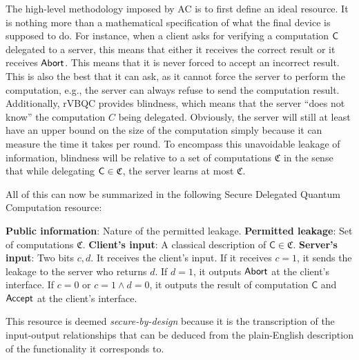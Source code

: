 The high-level methodology imposed by AC is to first define an ideal resource. It is nothing more than a mathematical specification of what the final device is supposed to do. For instance, when a client asks for verifying a computation \(\mathsf{C}\) delegated to a server, this means that either it receives the correct result or it receives \(\mathsf{Abort}\). This means that it is never forced to accept an incorrect result. This is also the best that it can ask, as it cannot force the server to perform the computation, e.g., the server can always refuse to send the computation result. Additionally, rVBQC provides blindness, which means that the server ``does not know'' the computation \(C\) being delegated. Obviously, the server will still at least have an upper bound on the size of the computation simply because it can measure the time it takes per round. To encompass this unavoidable leakage of information, blindness will be relative to a set of computations \(\mathfrak{C}\) in the sense that while delegating \(\mathsf{C}\in \mathfrak{C}\), the server learns at most \(\mathfrak{C}\).

All of this can now be summarized in the following Secure Delegated Quantum Computation resource:
\begin{resource}
  \label{res:sdqc}
  \item
  \begin{algorithmic}[0]
    \State \textbf{Public information}: Nature of the permitted leakage.
    \State \textbf{Permitted leakage}: Set of computations \(\mathfrak{C}\).
    \State \textbf{Client's input}: A classical description of \(\mathsf{C} \in \mathfrak{C}\).
    \State \textbf{Server's input}: Two bits \(c,d\).
    \State It receives the client's input.
    \State If it receives \(c=1\), it sends the leakage to the server who returns \(d\).
    \State If \(d=1\), it outputs \(\mathsf{Abort}\) at the client's interface.
    \State If \(c=0\) or \(c=1 \wedge d=0\), it outputs the result of computation \(\mathsf{C}\) and \(\mathsf{Accept}\) at the client's interface.
    \EndProcedure
  \end{algorithmic}
\end{resource}
This resource is deemed \emph{secure-by-design} because it is the transcription of the input-output relationships that can be deduced from the plain-English description of the functionality it corresponds to. 

